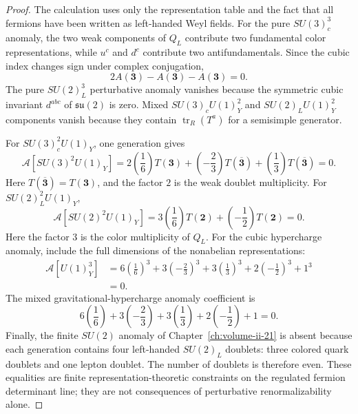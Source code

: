 \begin{proof}
The calculation uses only the representation table and the fact that all
fermions have been written as left-handed Weyl fields.  For the pure
\(SU(3)_c^3\) anomaly, the two weak components of \(Q_L\) contribute two
fundamental color representations, while \(u^c\) and \(d^c\) contribute two
antifundamentals.  Since the cubic index changes sign under complex
conjugation,
\[
  2A(\mathbf3)-A(\mathbf3)-A(\mathbf3)=0 .
\]
The pure \(SU(2)_L^3\) perturbative anomaly vanishes because the symmetric
cubic invariant \(d^{abc}\) of \(\mathfrak{su}(2)\) is zero.  Mixed
\(SU(3)_cU(1)_Y^2\) and \(SU(2)_LU(1)_Y^2\) components vanish because they
contain \(\operatorname{tr}_{R}(T^a)\) for a semisimple generator.

For \(SU(3)_c^2U(1)_Y\), one generation gives
\[
  \mathcal A[SU(3)^2U(1)_Y]
  =
  2\left(\frac16\right)T(\mathbf3)
  +\left(-\frac23\right)T(\overline{\mathbf3})
  +\left(\frac13\right)T(\overline{\mathbf3})
  =0 .
\]
Here \(T(\overline{\mathbf3})=T(\mathbf3)\), and the factor \(2\) is the weak
doublet multiplicity.  For \(SU(2)_L^2U(1)_Y\),
\[
  \mathcal A[SU(2)^2U(1)_Y]
  =
  3\left(\frac16\right)T(\mathbf2)
  +\left(-\frac12\right)T(\mathbf2)
  =0 .
\]
Here the factor \(3\) is the color multiplicity of \(Q_L\).  For the cubic
hypercharge anomaly, include the full dimensions of the nonabelian
representations:
\[
\begin{aligned}
  \mathcal A[U(1)_Y^3]
  &=
  6\left(\frac16\right)^3
  +3\left(-\frac23\right)^3
  +3\left(\frac13\right)^3
  +2\left(-\frac12\right)^3
  +1^3\\
  &=0 .
\end{aligned}
\]
The mixed gravitational-hypercharge anomaly coefficient is
\[
  6\left(\frac16\right)
  +3\left(-\frac23\right)
  +3\left(\frac13\right)
  +2\left(-\frac12\right)
  +1
  =0 .
\]
Finally, the finite \(SU(2)\) anomaly of
Chapter~\ref{ch:volume-ii-21} is absent because each
generation contains four left-handed \(SU(2)_L\) doublets: three colored
quark doublets and one lepton doublet.  The number of doublets is therefore
even.  These equalities are finite representation-theoretic constraints on
the regulated fermion determinant line; they are not consequences of
perturbative renormalizability alone.
\end{proof}

